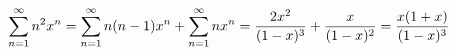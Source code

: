 \documentclass[preview]{standalone}
\begin{document}
\begin{align*}
\special{dvisvgm:raw <g id='unique000'>}\displaystyle\sum_{n=1}^{\infty}n^2x^n=\sum_{n=1}^{\infty}n(n-1)x^n+\sum_{n=1}^{\infty}nx^n=\dfrac{2x^2}{(1-x)^3}+\dfrac{x}{(1-x)^2}=\dfrac{x(1+x)}{(1-x)^3}\special{dvisvgm:raw </g>}
\end{align*}
\end{document}
